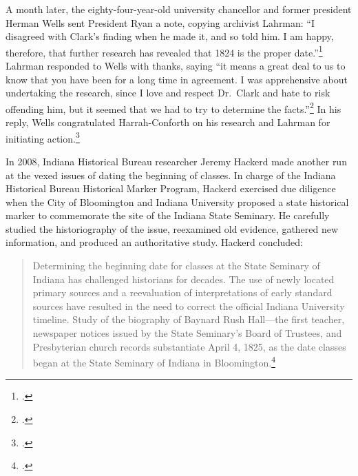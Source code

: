 \documentclass[
  american,
  letterpaper,
]{scrreprt}
\begin{document}
A month later, the eighty-four-year-old university chancellor and former
president Herman Wells sent President Ryan a note, copying archivist
Lahrman: ``I disagreed with Clark's finding when he made it, and so told
him. I am happy, therefore, that further research has revealed that 1824
is the proper date.''\footnote{.} Lahrman responded to Wells with thanks, saying ``it means
a great deal to us to know that you have been for a long time in
agreement. I was apprehensive about undertaking the research, since I
love and respect Dr.~Clark and hate to risk offending him, but it seemed
that we had to try to determine the facts.''\footnote{.} In his reply, Wells congratulated Harrah-Conforth
on his research and Lahrman for initiating action.\footnote{.}

In 2008, Indiana Historical Bureau researcher Jeremy Hackerd made
another run at the vexed issues of dating the beginning of classes. In
charge of the Indiana Historical Bureau Historical Marker Program,
Hackerd exercised due diligence when the City of Bloomington and Indiana
University proposed a state historical marker to commemorate the site of
the Indiana State Seminary. He carefully studied the historiography of
the issue, reexamined old evidence, gathered new information, and
produced an authoritative study. Hackerd concluded:

\begin{quote}
Determining the beginning date for classes at the State Seminary of
Indiana has challenged historians for decades. The use of newly located
primary sources and a reevaluation of interpretations of early standard
sources have resulted in the need to correct the official Indiana
University timeline. Study of the biography of Baynard Rush Hall---the
first teacher, newspaper notices issued by the State Seminary's Board of
Trustees, and Presbyterian church records substantiate April 4, 1825, as
the date classes began at the State Seminary of Indiana in
Bloomington.\footnote{.}
\end{quote}
\end{document}
